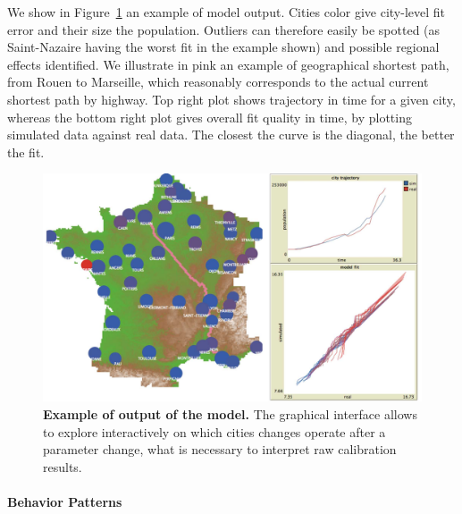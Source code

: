 \documentclass[Royal,sageh,times]{sagej}
\begin{document}
We show in Figure~\ref{fig:interface} an example of model output. Cities color give city-level fit error and their size the population. Outliers can therefore easily be spotted (as Saint-Nazaire having the worst fit in the example shown) and possible regional effects identified. We illustrate in pink an example of geographical shortest path, from Rouen to Marseille, which reasonably corresponds to the actual current shortest path by highway. Top right plot shows trajectory in time for a given city, whereas the bottom right plot gives overall fit quality in time, by plotting simulated data against real data. The closest the curve is  the diagonal, the better the fit.


\begin{figure}
\centering
\includegraphics[width=\textwidth]{figures/Fig2.jpg}
\caption{\textbf{Example of output of the model.} The graphical interface allows to explore interactively on which cities changes operate after a parameter change, what is necessary to interpret raw calibration results. }
\label{fig:interface}
\end{figure}


\paragraph{Behavior Patterns}
\end{document}
